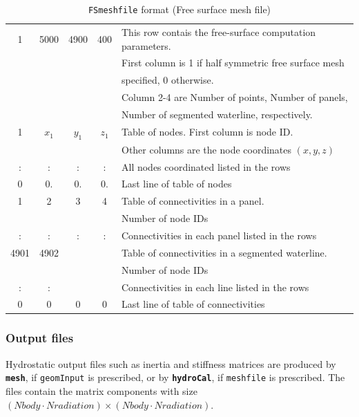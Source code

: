 \documentclass[12pt,a4paper,titlepage]{article}
\begin{document}
\begin{table}[ht]
\begin{center}
\caption{\texttt{FSmeshfile} format (Free surface mesh file)}\label{tab:FSmeshfile}
\begin{tabular}{ccccl}
\hline
1 & 5000&4900&400& This row contais the free-surface computation parameters.\\ 
\ &\ &\ &\ &  First column is 1 if half symmetric free surface mesh\\
\ &\ &\ &\ & specified, 0 otherwise.\\
\ &\ &\ &\ &  Column 2-4 are Number of points, Number of panels,\\
\ &\ &\ &\ &  Number of segmented waterline, respectively.\\
\hline
1 & $x_1$& $y_1$ &$z_1$ & Table of nodes. First column is node ID.\\
\ &\ &\ &\ &Other columns are the node coordinates $(x,y,z)$\\
\hline
: & :&  :& : & All nodes coordinated listed in the rows\\
\hline
0 & 0.&  0.& 0.& Last line of table of nodes\\
\hline
1 & 2& 3 & 4 & Table of connectivities in a panel.\\
\ &\ &\ &\ & Number of node IDs\\
\hline
: & :&  :& : & Connectivities in each panel listed in the rows\\
\hline
4901 & 4902& \ & \ & Table of connectivities in a segmented waterline.\\
\ &\ &\ &\ & Number of node IDs\\
\hline
: & :&  & & Connectivities in each line listed in the rows\\
\hline
0 & 0&  0& 0& Last line of table of connectivities\\
\hline
\end{tabular}
\end{center}
\end{table}


\subsubsection{Output files}
{Hydrostatic output files} such as inertia and stiffness matrices are produced by \textbf{\texttt{mesh}}, if \texttt{geomInput} is prescribed, or by \textbf{\texttt{hydroCal}}, if \texttt{meshfile} is prescribed. The files contain the matrix components with size $(Nbody\cdot Nradiation)\times (Nbody\cdot Nradiation)$.
\end{document}
